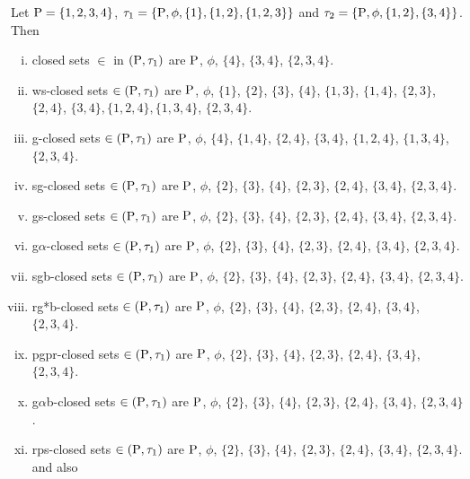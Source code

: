 \begin{exm}\label{exm2.2.19}
Let $\mathrm{P} = \{1, 2, 3, 4\}$, $\tau_{1} =\{\mathrm{P}, \phi, \{1\}, \{1, 2\},\{1, 2, 3\}\}$ and $\tau_{2} =\{\mathrm{P}, \phi, \{1, 2\},\{3, 4\}\}$. Then
\begin{enumerate}[(i)]
\item closed sets $\in$ in $(\mathrm{P}, \tau_{1})$ are $\mathrm{P}$, $\phi$, $\{4\}$, $\{3, 4\}$, $\{2, 3, 4\}$.
\item ws-closed sets $\in(\mathrm{P}, \tau_{1})$ are $\mathrm{P}$, $\phi$, $\{1\}$, $\{2\}$, $\{3\}$, $\{4\}$, $\{1, 3\}$, $\{1, 4\}$, $\{2, 3\}$, $\{2, 4\}$, $\{3, 4\}, \{1, 2, 4\}, \{1, 3, 4\}$, $\{2, 3, 4\}$.
\item g-closed sets $\in(\mathrm{P}, \tau_{1})$ are $\mathrm{P}$, $\phi$, $\{4\}$, $\{1, 4\}$, $\{2, 4\}$, $\{3, 4\}$, $\{1, 2, 4\}$, $\{1, 3, 4\}$, $\{2, 3, 4\}$.
\item sg-closed sets $\in(\mathrm{P}, \tau_{1})$ are $\mathrm{P}$, $\phi$, $\{2\}$, $\{3\}$, $\{4\}$, $\{2, 3\}$, $\{2, 4\}$, $\{3, 4\}$, $\{2, 3, 4\}$.
\item gs-closed sets $\in(\mathrm{P}, \tau_{1})$ are $\mathrm{P}$, $\phi$, $\{2\}$, $\{3\}$, $\{4\}$, $\{2, 3\}$, $\{2, 4\}$, $\{3, 4\}$, $\{2, 3, 4\}$.
\item g$\alpha$-closed sets $\in(\mathrm{P}, \tau_{1})$ are $\mathrm{P}$, $\phi$, $\{2\}$, $\{3\}$, $\{4\}$, $\{2, 3\}$, $\{2, 4\}$, $\{3, 4\}$, $\{2, 3, 4\}$.
\item sgb-closed sets $\in(\mathrm{P}, \tau_{1})$ are $\mathrm{P}$, $\phi$, $\{2\}$, $\{3\}$, $\{4\}$, $\{2, 3\}$, $\{2, 4\}$, $\{3, 4\}$, $\{2, 3, 4\}$.
\item rg*b-closed sets $\in(\mathrm{P}, \tau_{1})$ are $\mathrm{P}$, $\phi$, $\{2\}$, $\{3\}$, $\{4\}$, $\{2, 3\}$, $\{2, 4\}$, $\{3, 4\}$, $\{2, 3, 4\}$.
\item pgpr-closed sets $\in(\mathrm{P}, \tau_{1})$ are $\mathrm{P}$, $\phi$, $\{2\}$, $\{3\}$, $\{4\}$, $\{2, 3\}$, $\{2, 4\}$, $\{3, 4\}$, $\{2, 3, 4\}$.
\item g$\alpha$b-closed sets $\in(\mathrm{P}, \tau_{1})$ are $\mathrm{P}$, $\phi$, $\{2\}$, $\{3\}$, $\{4\}$, $\{2, 3\}$, $\{2, 4\}$, $\{3, 4\}$, $\{2, 3, 4\}$.
\item rps-closed sets $\in(\mathrm{P}, \tau_{1})$ are $\mathrm{P}$, $\phi$, $\{2\}$, $\{3\}$, $\{4\}$, $\{2, 3\}$, $\{2, 4\}$, $\{3, 4\}$, $\{2, 3, 4\}$. and also
\end{enumerate}


\end{exm}
